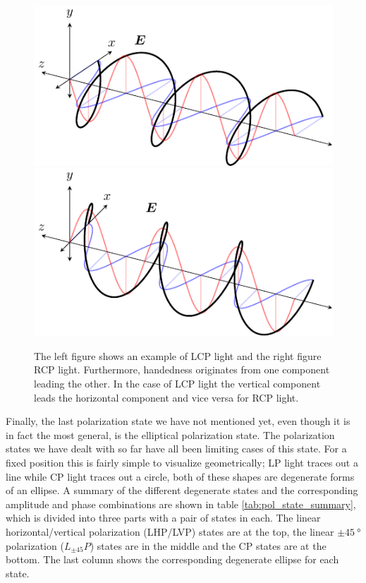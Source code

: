 \begin{figure}
\centering
\subcaptionbox{\label{fig:circ_pol_planewave_a}}
    {\includegraphics[scale=0.8]{images/theory/tikz_circ_pol_lh.pdf}}
\subcaptionbox{\label{fig:circ_pol_planewave_b}}
    {\includegraphics[scale=0.8]{images/theory/tikz_circ_pol_rh.pdf}}
\caption{The left figure shows an example of LCP light and the right figure RCP light. Furthermore, handedness originates from one component leading the other. In the case of LCP light the vertical component leads the horizontal component and vice versa for RCP light.}
\label{fig:circ_pol_planewave}
\end{figure}

Finally, the last polarization state we have not mentioned yet, even though it is in fact the most general, is the elliptical polarization state. The polarization states we have dealt with so far have all been limiting cases of this state. For a fixed position this is fairly simple to visualize geometrically; LP light traces out a line while CP light traces out a circle, both of these shapes are degenerate forms of an ellipse. A summary of the different degenerate states and the corresponding amplitude and phase combinations are shown in table \ref{tab:pol_state_summary}, which is divided into three parts with a pair of states in each. The linear horizontal/vertical polarization (LHP/LVP) states are at the top, the linear $\pm\SI{45}{\degree}$ polarization ($L_{\pm45}P$) states are in the middle and the CP states are at the bottom. The last column shows the corresponding degenerate ellipse for each state.

